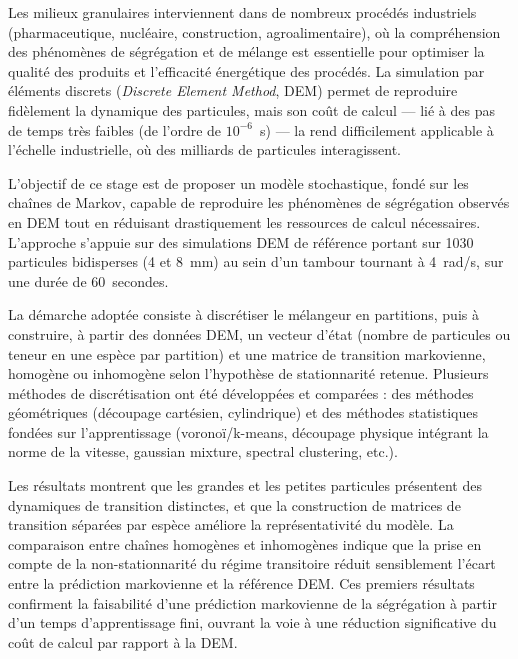 \documentclass{MemoireMaster}
\begin{document}
\fairepagedegarde


\begin{resumefr}
Les milieux granulaires interviennent dans de nombreux procédés industriels (pharmaceutique, nucléaire, construction, agroalimentaire), où la compréhension des phénomènes de ségrégation et de mélange est essentielle pour optimiser la qualité des produits et l'efficacité énergétique des procédés. La simulation par éléments discrets (\emph{Discrete Element Method}, DEM) permet de reproduire fidèlement la dynamique des particules, mais son coût de calcul --- lié à des pas de temps très faibles (de l'ordre de $10^{-6}$~s) --- la rend difficilement applicable à l'échelle industrielle, où des milliards de particules interagissent.

L'objectif de ce stage est de proposer un modèle stochastique, fondé sur les chaînes de Markov, capable de reproduire les phénomènes de ségrégation observés en DEM tout en réduisant drastiquement les ressources de calcul nécessaires. L'approche s'appuie sur des simulations DEM de référence portant sur 1030 particules bidisperses (4 et 8~mm) au sein d'un tambour tournant à 4~rad/s, sur une durée de 60~secondes.

La démarche adoptée consiste à discrétiser le mélangeur en partitions, puis à construire, à partir des données DEM, un vecteur d'état (nombre de particules ou teneur en une espèce par partition) et une matrice de transition markovienne, homogène ou inhomogène selon l'hypothèse de stationnarité retenue. Plusieurs méthodes de discrétisation ont été développées et comparées : des méthodes géométriques (découpage cartésien, cylindrique) et des méthodes statistiques fondées sur l'apprentissage (voronoï/k-means, découpage physique intégrant la norme de la vitesse, gaussian mixture, spectral clustering, etc.).

Les résultats montrent que les grandes et les petites particules présentent des dynamiques de transition distinctes, et que la construction de matrices de transition séparées par espèce améliore la représentativité du modèle. La comparaison entre chaînes homogènes et inhomogènes indique que la prise en compte de la non-stationnarité du régime transitoire réduit sensiblement l'écart entre la prédiction markovienne et la référence DEM. Ces premiers résultats confirment la faisabilité d'une prédiction markovienne de la ségrégation à partir d'un temps d'apprentissage fini, ouvrant la voie à une réduction significative du coût de calcul par rapport à la DEM.
\end{resumefr}
\end{document}

